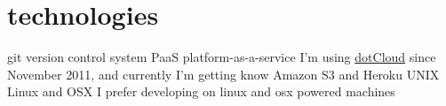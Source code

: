 \documentclass[]{friggeri-cv}
\begin{document}
\section{technologies}

\begin{entrylist}
  \entry
    {git}
    {version control system}
    {}
    {}
  \entry
    {PaaS}
    {platform-as-a-service}
    {}
    {I'm using \href{http://dotcloud.com}{dotCloud} since November 2011, and currently I'm getting know Amazon S3 and Heroku}
  \entry
	{UNIX}
	{Linux and OSX}
	{}
	{I prefer developing on linux and osx powered machines}
\end{entrylist}


\end{document}
